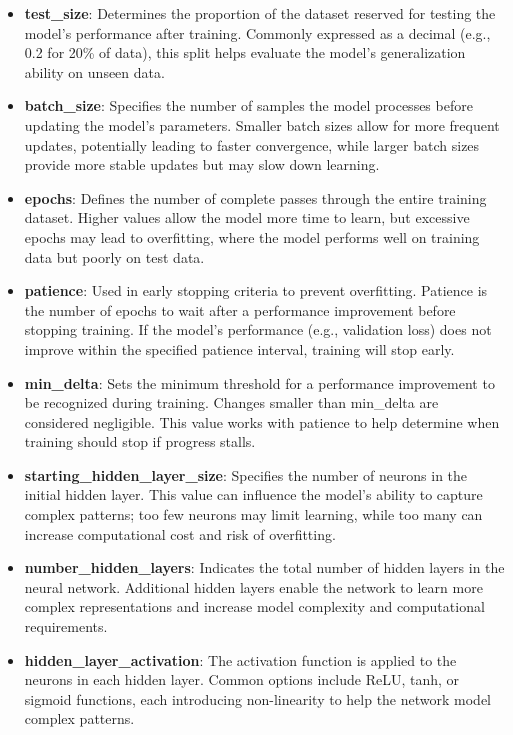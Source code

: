 \documentclass[conference]{IEEEtran}
\begin{document}
\begin{itemize}
    \item \textbf{test\_size}: Determines the proportion of the dataset reserved for testing the model's performance after training. Commonly expressed as a decimal (e.g., 0.2 for 20\% of data), this split helps evaluate the model's generalization ability on unseen data.
    \item \textbf{batch\_size}: Specifies the number of samples the model processes before updating the model's parameters. Smaller batch sizes allow for more frequent updates, potentially leading to faster convergence, while larger batch sizes provide more stable updates but may slow down learning.
    \item \textbf{epochs}: Defines the number of complete passes through the entire training dataset. Higher values allow the model more time to learn, but excessive epochs may lead to overfitting, where the model performs well on training data but poorly on test data.
    \item \textbf{patience}: Used in early stopping criteria to prevent overfitting. Patience is the number of epochs to wait after a performance improvement before stopping training. If the model's performance (e.g., validation loss) does not improve within the specified patience interval, training will stop early.
    \item \textbf{min\_delta}: Sets the minimum threshold for a performance improvement to be recognized during training. Changes smaller than min\_delta are considered negligible. This value works with patience to help determine when training should stop if progress stalls.
    \item \textbf{starting\_hidden\_layer\_size}: Specifies the number of neurons in the initial hidden layer. This value can influence the model's ability to capture complex patterns; too few neurons may limit learning, while too many can increase computational cost and risk of overfitting.
    \item \textbf{number\_hidden\_layers}: Indicates the total number of hidden layers in the neural network. Additional hidden layers enable the network to learn more complex representations and increase model complexity and computational requirements.
    \item \textbf{hidden\_layer\_activation}: The activation function is applied to the neurons in each hidden layer. Common options include ReLU, tanh, or sigmoid functions, each introducing non-linearity to help the network model complex patterns.

\end{itemize}
\end{document}
